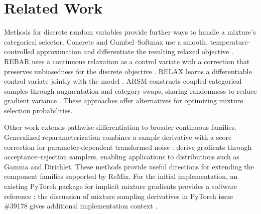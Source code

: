 \section{Related Work}
Methods for discrete random variables provide further ways to handle a mixture's
categorical selector. Concrete and Gumbel--Softmax use a smooth,
temperature-controlled approximation and differentiate the resulting relaxed
objective \citep{maddison2017concrete,jang2017gumbel}. REBAR uses a continuous
relaxation as a control variate with a correction that preserves unbiasedness
for the discrete objective \citep{tucker2017rebar}. RELAX learns a differentiable
control variate jointly with the model \citep{grathwohl2018relax}. ARSM constructs
coupled categorical samples through augmentation and category swaps, sharing
randomness to reduce gradient variance \citep{yin2019arsm}. These approaches
offer alternatives for optimizing mixture selection probabilities.

Other work extends pathwise differentiation to broader continuous families.
Generalized reparameterization combines a sample derivative with a score
correction for parameter-dependent transformed noise \citep{ruiz2016generalized}.
\citet{naesseth2017rejection} derive gradients through acceptance--rejection
samplers, enabling applications to distributions such as Gamma and Dirichlet.
These methods provide useful directions for extending the component families
supported by ReMix. For the initial implementation, an existing PyTorch package
for implicit mixture gradients provides a software reference
\citep{simkusMixture}; the discussion of mixture sampling derivatives in PyTorch
issue \#39178 gives additional implementation context \citep{pytorch39178}.
